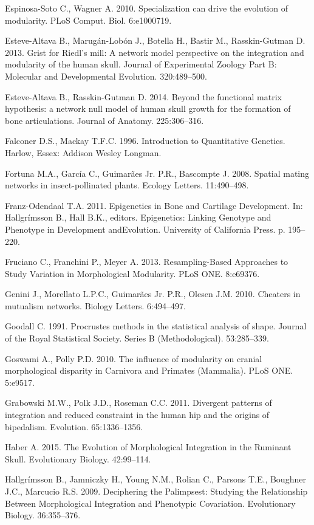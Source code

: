 \documentclass[12pt,]{article}
\begin{document}
Espinosa-Soto C., Wagner A. 2010. Specialization can drive the evolution
of modularity. PLoS Comput. Biol. 6:e1000719.

Esteve-Altava B., Marugán-Lobón J., Botella H., Bastir M.,
Rasskin-Gutman D. 2013. Grist for Riedl's mill: A network model
perspective on the integration and modularity of the human skull.
Journal of Experimental Zoology Part B: Molecular and Developmental
Evolution. 320:489--500.

Esteve-Altava B., Rasskin-Gutman D. 2014. Beyond the functional matrix
hypothesis: a network null model of human skull growth for the formation
of bone articulations. Journal of Anatomy. 225:306--316.

Falconer D.S., Mackay T.F.C. 1996. Introduction to Quantitative
Genetics. Harlow, Essex: Addison Wesley Longman.

Fortuna M.A., García C., Guimarães Jr. P.R., Bascompte J. 2008. Spatial
mating networks in insect-pollinated plants. Ecology Letters.
11:490--498.

Franz-Odendaal T.A. 2011. Epigenetics in Bone and Cartilage Development.
In: Hallgrímsson B., Hall B.K., editors. Epigenetics: Linking Genotype
and Phenotype in Development andEvolution. University of California
Press. p. 195--220.

Fruciano C., Franchini P., Meyer A. 2013. Resampling-Based Approaches to
Study Variation in Morphological Modularity. PLoS ONE. 8:e69376.

Genini J., Morellato L.P.C., Guimarães Jr. P.R., Olesen J.M. 2010.
Cheaters in mutualism networks. Biology Letters. 6:494--497.

Goodall C. 1991. Procrustes methods in the statistical analysis of
shape. Journal of the Royal Statistical Society. Series B
(Methodological). 53:285--339.

Goswami A., Polly P.D. 2010. The influence of modularity on cranial
morphological disparity in Carnivora and Primates (Mammalia). PLoS ONE.
5:e9517.

Grabowski M.W., Polk J.D., Roseman C.C. 2011. Divergent patterns of
integration and reduced constraint in the human hip and the origins of
bipedalism. Evolution. 65:1336--1356.

Haber A. 2015. The Evolution of Morphological Integration in the
Ruminant Skull. Evolutionary Biology. 42:99--114.

Hallgrímsson B., Jamniczky H., Young N.M., Rolian C., Parsons T.E.,
Boughner J.C., Marcucio R.S. 2009. Deciphering the Palimpsest: Studying
the Relationship Between Morphological Integration and Phenotypic
Covariation. Evolutionary Biology. 36:355--376.
\end{document}
